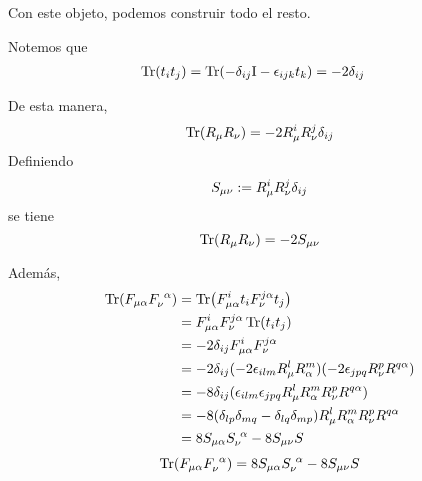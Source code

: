 Con este objeto, podemos construir todo el resto.

Notemos que
\begin{align}
  \Tr(t_it_j)&=\Tr(-\delta_{ij}\mathrm{I} -\epsilon_{ijk}t_k)=-2\delta_{ij}
\end{align}

De esta manera,
\begin{equation}
  \Tr(R_\mu R_\nu )=-2R_\mu ^{i}R_\nu ^j \delta_{ij}
\end{equation}
Definiendo
\begin{equation}
  S_{\mu\nu }:=R_\mu ^{i}R_\nu ^j \delta_{ij}
\end{equation}
se tiene
\begin{equation}\label{trrr}
  \Tr(R_\mu R_\nu )=-2S_{\mu\nu }
\end{equation}

Además,
\begin{align}
  \Tr(F_{\mu\alpha }F_\nu ^{~\alpha })&=\Tr(F_{\mu\alpha }^{i}t_iF_\nu ^{j\alpha }t_j)\\
  &=F_{\mu\alpha }^{i}F_\nu ^{j\alpha }\Tr(t_it_j)\\
  &=-2\delta_{ij}F_{\mu\alpha }^{i}F_\nu ^{j\alpha }\\
  &=-2\delta_{ij}(-2\epsilon_{ilm}R_\mu ^lR_\alpha ^m)(-2\epsilon_{jpq}R_\nu ^pR^{q\alpha })\\
  &=-8\delta_{ij}(\epsilon_{ilm}\epsilon_{jpq}R_\mu ^lR_\alpha ^m R_\nu ^p R^{q\alpha })\\
  &=-8(\delta_{lp}\delta_{mq}-\delta_{lq}\delta_{mp})R_\mu ^lR_\alpha ^m R_\nu ^p R^{q\alpha }\\
  &=8S_{\mu\alpha }S_\nu ^{~\alpha }-8S_{\mu\nu }S
\end{align}
\begin{equation}\label{trff}
   \Tr(F_{\mu\alpha }F_\nu ^{~\alpha })=8S_{\mu\alpha }S_\nu ^{~\alpha }-8S_{\mu\nu }S
\end{equation}

